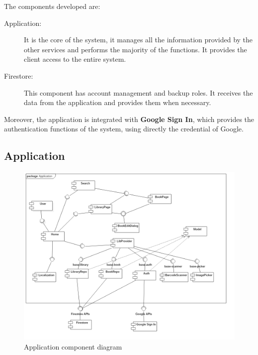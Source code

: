 The components developed are:
\begin{description}
    \item[Application:] It is the core of the system, it manages all the information provided by the other services
     and performs the majority of the functions. It provides the client access to the entire system.
    \item[Firestore:] This component has account management and backup roles. It receives the data from the application and provides them when necessary.
\end{description}
Moreover, the application is integrated with \textbf{Google Sign In}, which provides the authentication functions of the system, 
using directly the credential of Google.
\clearpage
\subsection{Application}
\begin{figure}[!h]
    \centering
    \includegraphics[scale=0.4]{images/application-component-diagram.png}
    \caption{Application component diagram}
    \label{ref:applicationcomponentdiagram}
\end{figure}
